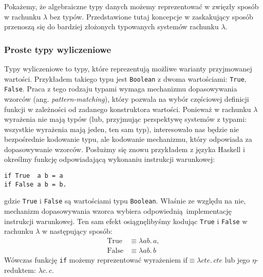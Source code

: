 Pokażemy, że algebraiczne typy danych możemy reprezentować w zwięzły sposób w rachunku \(\lambda\) bez typów. Przedstawione tutaj koncepcje w zaskakujący sposób przenoszą się do bardziej złożonych typowanych systemów rachunku \(\lambda\).

\subsubsection{Proste typy wyliczeniowe}\label{ref:untyped_simple_enumeration}
Typy wyliczeniowe to typy, które reprezentują możliwe warianty przyjmowanej wartości. Przykładem takiego typu jest \texttt{Boolean} z dwoma wartościami: \texttt{True}, \texttt{False}. Praca z tego rodzaju typami wymaga mechanizmu dopasowywania wzorców (ang. \emph{pattern-matching}), który pozwala na wybór częściowej definicji funkcji w zależności od zadanego konstruktora wartości. Ponieważ w rachunku \(\lambda\) wyrażenia nie mają typów (lub, przyjmując perspektywę systemów z typami: wszystkie wyrażenia mają jeden, ten sam typ), interesowało nas będzie nie bezpośrednie kodowanie typu, ale kodowanie mechanizmu, który odpowiada za dopasowywanie wzorców. Posłużmy się znowu przykładem z języka Haskell i określmy funkcję odpowiadającą wykonaniu instrukcji warunkowej:
\begin{verbatim}
if True  a b = a
if False a b = b.
\end{verbatim}
gdzie \texttt{True} i \texttt{False} są wartościami typu \texttt{Boolean}. Właśnie ze względu na nie, mechanizm dopasowywania wzorca wybiera odpowiednią implementację instrukcji warunkowej. Ten sam efekt osiągnęlibyśmy kodując \texttt{True} i \texttt{False} w rachunku \(\lambda\) w następujący sposób:
\begin{align*}
  \mathrm{True} &\equiv \lambda a b.\,a,\\
  \mathrm{False} &\equiv \lambda a b.\,b
\end{align*}
Wówczas funkcję \texttt{if} możemy reprezentować wyrażeniem \(\mathrm{if}\equiv\lambda c t e.\, cte\) lub jego \(\eta\)-reduktem: \(\lambda c.\,c\).
